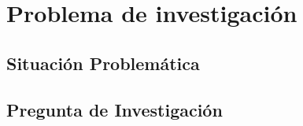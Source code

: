 \chapter{Problema de investigación}
\label{Problemática}

\section{Situación Problemática}



\section{Pregunta de Investigación}





